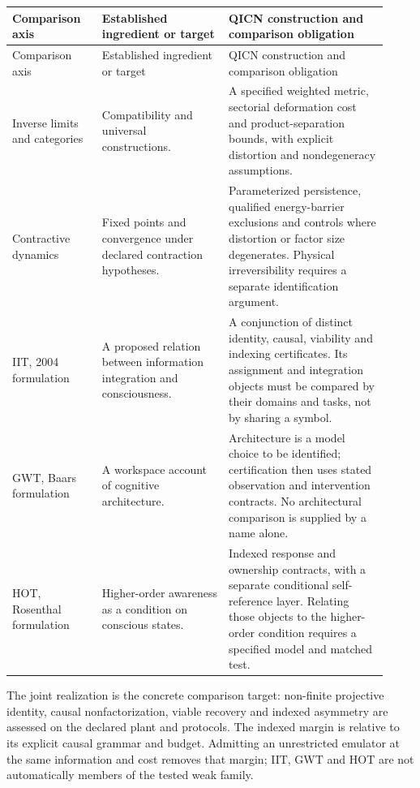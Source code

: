 \documentclass[11pt,a4paper,openany]{book}
\begin{document}
\begingroup\small
\begin{longtable}{@{}p{0.22\linewidth}p{0.31\linewidth}p{0.39\linewidth}@{}}
\toprule Comparison axis & Established ingredient or target & QICN construction and comparison obligation \\ \midrule
\endfirsthead
\toprule Comparison axis & Established ingredient or target & QICN construction and comparison obligation \\ \midrule
\endhead
Inverse limits and categories \cite{maclane1998,ribes} & Compatibility and universal constructions. & A specified weighted metric, sectorial deformation cost and product-separation bounds, with explicit distortion and nondegeneracy assumptions. \\ \addlinespace
Contractive dynamics \cite{banach,katok1995} & Fixed points and convergence under declared contraction hypotheses. & Parameterized persistence, qualified energy-barrier exclusions and controls where distortion or factor size degenerates. Physical irreversibility requires a separate identification argument. \\ \addlinespace
IIT, 2004 formulation \cite{tononi2004} & A proposed relation between information integration and consciousness. & A conjunction of distinct identity, causal, viability and indexing certificates. Its assignment and integration objects must be compared by their domains and tasks, not by sharing a symbol. \\ \addlinespace
GWT, Baars formulation \cite{baars1988} & A workspace account of cognitive architecture. & Architecture is a model choice to be identified; certification then uses stated observation and intervention contracts. No architectural comparison is supplied by a name alone. \\ \addlinespace
HOT, Rosenthal formulation \cite{rosenthal1986} & Higher-order awareness as a condition on conscious states. & Indexed response and ownership contracts, with a separate conditional self-reference layer. Relating those objects to the higher-order condition requires a specified model and matched test. \\ \bottomrule
\end{longtable}
\endgroup

The joint realization is the concrete comparison target: non-finite
projective identity, causal nonfactorization, viable recovery and indexed
asymmetry are assessed on the declared plant and protocols. The indexed
margin is relative to its explicit causal grammar and budget. Admitting an
unrestricted emulator at the same information and cost removes that margin;
IIT, GWT and HOT are not automatically members of the tested weak family.
\end{document}
